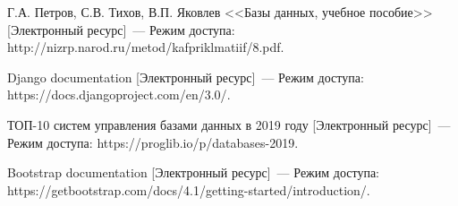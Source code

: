 
\begin{thebibliography}{9} 
    
     Г.А. Петров, С.В. Тихов, В.П. Яковлев <<Базы данных, учебное пособие>> [Электронный ресурс]~--- Режим доступа: {http://nizrp.narod.ru/metod/kafpriklmatiif/8.pdf}.
    
     Django documentation [Электронный ресурс]~--- Режим доступа: {https://docs.djangoproject.com/en/3.0/}.
    
     ТОП-10 систем управления базами данных в 2019 году [Электронный ресурс]~--- Режим доступа: {https://proglib.io/p/databases-2019}.
    
     Bootstrap documentation [Электронный ресурс]~--- Режим доступа: {https://getbootstrap.com/docs/4.1/getting-started/introduction/}.
    
\end{thebibliography}
